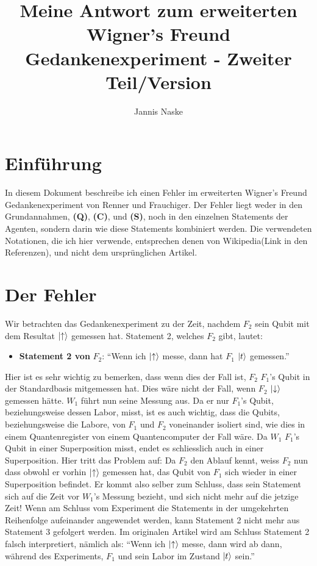 \documentclass[a4paper]{article}
\title{Meine Antwort zum erweiterten Wigner's Freund Gedankenexperiment - Zweiter Teil/Version}
\author{Jannis Naske}
\begin{document}
\maketitle
\afterpage{\cfoot{\thepage}}
\section*{Einführung}
In diesem Dokument beschreibe ich einen Fehler im erweiterten Wigner's Freund Gedankenexperiment von Renner und Frauchiger. Der Fehler liegt weder in den Grundannahmen, \textbf{(Q)}, \textbf{(C)}, und \textbf{(S)}, noch in den einzelnen Statements der Agenten, sondern darin wie diese Statements kombiniert werden. Die verwendeten Notationen, die ich hier verwende, entsprechen denen von Wikipedia(Link in den Referenzen), und nicht dem ursprünglichen Artikel.

\section*{Der Fehler}
Wir betrachten das Gedankenexperiment zu der Zeit, nachdem $F_2$ sein Qubit mit dem Resultat $\ket{\uparrow}$ gemessen hat. Statement 2, welches $F_2$ gibt, lautet:
\begin{itemize}
	\item \textbf{Statement 2 von} $F_2$: ``Wenn ich $\ket{\uparrow}$ messe, dann hat $F_1$ $\ket{t}$ gemessen.''
\end{itemize}
Hier ist es sehr wichtig zu bemerken, dass wenn dies der Fall ist, $F_2$ $F_1$'s Qubit in der Standardbasis mitgemessen hat. Dies wäre nicht der Fall, wenn $F_2$ $\ket{\downarrow}$ gemessen hätte. $W_1$ führt nun seine Messung aus. Da er nur $F_1$'s Qubit, beziehungsweise dessen Labor, misst, ist es auch wichtig, dass die Qubits, beziehungsweise die Labore, von $F_1$ und $F_2$ voneinander isoliert sind, wie dies in einem Quantenregister von einem Quantencomputer der Fall wäre. Da $W_1$ $F_1$'s Qubit in einer Superposition misst, endet es schliesslich auch in einer Superposition. Hier tritt das Problem auf: Da $F_2$ den Ablauf kennt, weiss $F_2$ nun dass obwohl er vorhin $\ket{\uparrow}$ gemessen hat, das Qubit von $F_1$ sich wieder in einer Superposition befindet. Er kommt also selber zum Schluss, dass sein Statement sich auf die Zeit vor $W_1$'s Messung bezieht, und sich nicht mehr auf die jetzige Zeit! Wenn am Schluss vom Experiment die Statements in der umgekehrten Reihenfolge aufeinander angewendet werden, kann Statement 2 nicht mehr aus Statement 3 gefolgert werden. Im originalen Artikel wird am Schluss Statement 2 falsch interpretiert, nämlich als: ``Wenn ich $\ket{\uparrow}$ messe, dann wird ab dann, während des Experiments, $F_1$ und sein Labor im Zustand $\ket{t}$ sein.''
\end{document}
